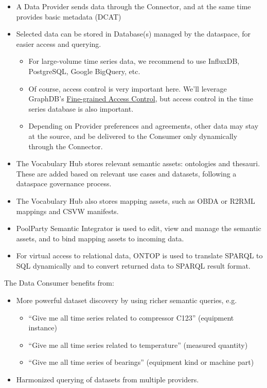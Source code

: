 \documentclass[
  super,
  preprint,
  3p]{elsarticle}
\providecommand{\tightlist}{%
  \setlength{\itemsep}{0pt}\setlength{\parskip}{0pt}}\usepackage{longtable,booktabs,array}
\begin{document}
\begin{itemize}
\tightlist
\item
  A Data Provider sends data through the Connector, and at the same time
  provides basic metadata (DCAT)
\item
  Selected data can be stored in Database(s) managed by the dataspace,
  for easier access and querying.

  \begin{itemize}
  \tightlist
  \item
    For large-volume time series data, we recommend to use InfluxDB,
    PostgreSQL, Google BigQuery, etc.
  \item
    Of course, access control is very important here. We'll leverage
    GraphDB's
    \href{https://graphdb.ontotext.com/documentation/10.6/fine-grained-access-control.html}{Fine-grained
    Access Control}, but access control in the time series database is
    also important.
  \item
    Depending on Provider preferences and agreements, other data may
    stay at the source, and be delivered to the Consumer only
    dynamically through the Connector.
  \end{itemize}
\item
  The Vocabulary Hub stores relevant semantic assets: ontologies and
  thesauri. These are added based on relevant use cases and datasets,
  following a dataspace governance process.
\item
  The Vocabulary Hub also stores mapping assets, such as OBDA or R2RML
  mappings and CSVW manifests.
\item
  PoolParty Semantic Integrator is used to edit, view and manage the
  semantic assets, and to bind mapping assets to incoming data.
\item
  For virtual access to relational data, ONTOP is used to translate
  SPARQL to SQL dynamically and to convert returned data to SPARQL
  result format.
\end{itemize}

The Data Consumer benefits from:

\begin{itemize}
\tightlist
\item
  More powerful dataset discovery by using richer semantic queries, e.g.

  \begin{itemize}
  \tightlist
  \item
    ``Give me all time series related to compressor C123'' (equipment
    instance)
  \item
    ``Give me all time series related to temperature'' (measured
    quantity)
  \item
    ``Give me all time series of bearings'' (equipment kind or machine
    part)
  \end{itemize}
\item
  Harmonized querying of datasets from multiple providers.
\end{itemize}
\end{document}
